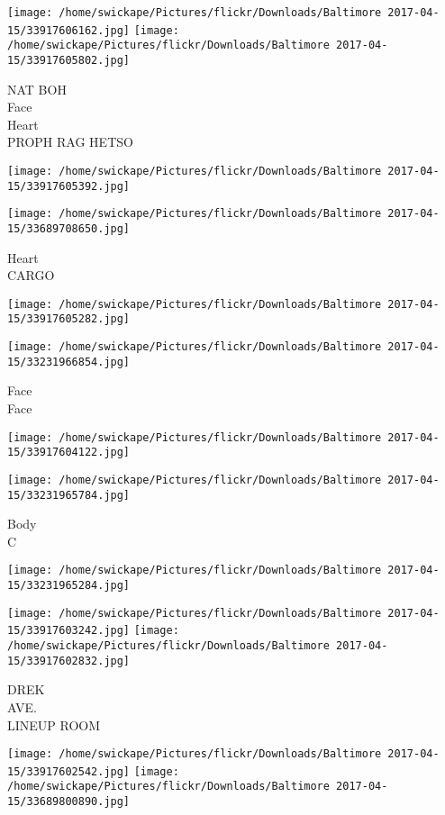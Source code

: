 \documentclass[10pt,letterpaper]{article}
\begin{document}
\texttt{[image: /home/swickape/Pictures/flickr/Downloads/Baltimore 2017-04-15/33917606162.jpg]}
\texttt{[image: /home/swickape/Pictures/flickr/Downloads/Baltimore 2017-04-15/33917605802.jpg]}

NAT BOH\\
Face\\
Heart\\
PROPH RAG HETSO
\pagebreak

\texttt{[image: /home/swickape/Pictures/flickr/Downloads/Baltimore 2017-04-15/33917605392.jpg]}

\vspace{0.25in}
\texttt{[image: /home/swickape/Pictures/flickr/Downloads/Baltimore 2017-04-15/33689708650.jpg]}

Heart\\
CARGO
\pagebreak

\texttt{[image: /home/swickape/Pictures/flickr/Downloads/Baltimore 2017-04-15/33917605282.jpg]}

\vspace{0.25in}
\texttt{[image: /home/swickape/Pictures/flickr/Downloads/Baltimore 2017-04-15/33231966854.jpg]}

Face\\
Face
\pagebreak

\texttt{[image: /home/swickape/Pictures/flickr/Downloads/Baltimore 2017-04-15/33917604122.jpg]}

\vspace{0.25in}
\texttt{[image: /home/swickape/Pictures/flickr/Downloads/Baltimore 2017-04-15/33231965784.jpg]}

Body\\
C
\pagebreak

\texttt{[image: /home/swickape/Pictures/flickr/Downloads/Baltimore 2017-04-15/33231965284.jpg]}

\vspace{0.25in}
\texttt{[image: /home/swickape/Pictures/flickr/Downloads/Baltimore 2017-04-15/33917603242.jpg]}
\texttt{[image: /home/swickape/Pictures/flickr/Downloads/Baltimore 2017-04-15/33917602832.jpg]}

DREK\\
AVE.\\
LINEUP ROOM
\pagebreak

\texttt{[image: /home/swickape/Pictures/flickr/Downloads/Baltimore 2017-04-15/33917602542.jpg]}
\texttt{[image: /home/swickape/Pictures/flickr/Downloads/Baltimore 2017-04-15/33689800890.jpg]}
\end{document}
